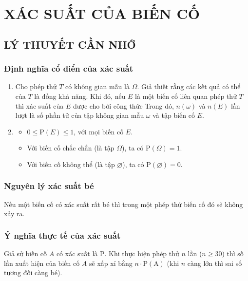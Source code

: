 \section{XÁC SUẤT CỦA BIẾN CỐ}
\subsection{LÝ THUYẾT CẦN NHỚ}
\subsubsection{Định nghĩa cổ điển của xác suất}

\begin{enumerate}[\iconMT]
	\item 	{} Cho phép thử $T$ có không gian mẫu là $\Omega$. Giả thiết rằng các kết quả có thể của $T$ là đồng khả năng. Khi đó, nếu $E$ là một biến cố liên quan phép thử $T$ thì xác suất của $E$ được cho bởi công thức
	Trong đó, $n(\omega)$ và $n(E)$ lần lượt là số phần tử của tập không gian mẫu $\omega$ và tập biến cố $E$.
	\item {}
	\begin{boxkn}
		\begin{itemize}
			
			\item $0\le \mathrm{P}(E)\le 1$, với mọi biến cố $E$.
			\item Với biến cố chắc chắn (là tập $\Omega$), ta có  $\mathrm{P}(\Omega)=1$.
			\item Với biến cố không thể (là tập $\varnothing$), ta có  $\mathrm{P}(\varnothing)=0$.
		\end{itemize}
	\end{boxkn}
\end{enumerate}
\subsubsection{Nguyên lý xác suất bé}

Nếu một biến cố có xác suất rất bé thì trong một phép thử biến cố đó sẽ không xảy ra.

\subsubsection{Ý nghĩa thực tế của xác suất}
Giả sử biến cố $A$ có xác suất là $\mathrm{P}$. Khi thực hiện phép thử $n$ lần ($n\ge 30$) thì số lần xuất hiện của biến cố $A$ sẽ xấp xỉ bằng $n\cdot \mathrm{P(A)}$ (khi $n$ càng lớn thì sai số tương đối càng bé).
